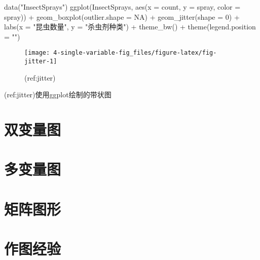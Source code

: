 \documentclass[
  lang=cn,
  11pt,
  scheme=chinese,
  chinesefont=nofont,
  citestyle=gb7714-2015,
  bibstyle=gb7714-2015]{elegantbook}
\newenvironment{Shaded}{\begin{snugshade}}{\end{snugshade}}
\newcommand{\AttributeTok}[1]{\textcolor[rgb]{0.77,0.63,0.00}{#1}}
\newcommand{\ConstantTok}[1]{\textcolor[rgb]{0.00,0.00,0.00}{#1}}
\newcommand{\DecValTok}[1]{\textcolor[rgb]{0.00,0.00,0.81}{#1}}
\newcommand{\FunctionTok}[1]{\textcolor[rgb]{0.00,0.00,0.00}{#1}}
\newcommand{\NormalTok}[1]{#1}
\newcommand{\SpecialCharTok}[1]{\textcolor[rgb]{0.00,0.00,0.00}{#1}}
\newcommand{\StringTok}[1]{\textcolor[rgb]{0.31,0.60,0.02}{#1}}
\begin{document}
\begin{Shaded}
\begin{Highlighting}[]
\FunctionTok{data}\NormalTok{(}\StringTok{"InsectSprays"}\NormalTok{)}
\FunctionTok{ggplot}\NormalTok{(InsectSprays, }\FunctionTok{aes}\NormalTok{(}\AttributeTok{x =}\NormalTok{ count, }\AttributeTok{y =}\NormalTok{ spray, }\AttributeTok{color =}\NormalTok{ spray)) }\SpecialCharTok{+}
  \FunctionTok{geom\_boxplot}\NormalTok{(}\AttributeTok{outlier.shape =} \ConstantTok{NA}\NormalTok{) }\SpecialCharTok{+}
  \FunctionTok{geom\_jitter}\NormalTok{(}\AttributeTok{shape =} \DecValTok{0}\NormalTok{) }\SpecialCharTok{+}
  \FunctionTok{labs}\NormalTok{(}\AttributeTok{x =} \StringTok{"昆虫数量"}\NormalTok{, }\AttributeTok{y =} \StringTok{"杀虫剂种类"}\NormalTok{) }\SpecialCharTok{+}
  \FunctionTok{theme\_bw}\NormalTok{() }\SpecialCharTok{+}
  \FunctionTok{theme}\NormalTok{(}\AttributeTok{legend.position =} \StringTok{""}\NormalTok{)}
\end{Highlighting}
\end{Shaded}

\begin{figure}

{\centering \texttt{[image: 4-single-variable-fig\_files/figure-latex/fig-jitter-1]} 

}

\caption{(ref:jitter)}\label{fig:fig-jitter}
\end{figure}

(ref:jitter)使用ggplot绘制的带状图

\hypertarget{double-variable-fig}{%
\chapter{双变量图}\label{double-variable-fig}}

\hypertarget{mutiple-variable-fig}{%
\chapter{多变量图}\label{mutiple-variable-fig}}

\hypertarget{matrix-fig}{%
\chapter{矩阵图形}\label{matrix-fig}}

\hypertarget{experience}{%
\chapter{作图经验}\label{experience}}
\end{document}
